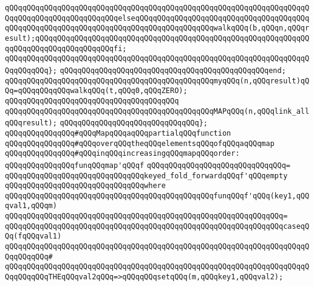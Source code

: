 \verb|qQQqqQQqqQQqqQQqqQQqqQQqqQQqqQQqqQQqqQQqqQQqqQQqqQQqqQQqqQQqqQQqqQQqqQQqqQQqqQQqqQQqqQQqqQQqqQQqelseqQQqqQQqqQQqqQQqqQQqqQQqqQQqqQQqqQQqqQQqqQQqqQQqqQQqqQQqqQQqqQQqqQQqqQQqqQQqqQQqqQQqqQQqwalkqQQq(b,qQQqn,qQQqresult);qQQqqQQqqQQqqQQqqQQqqQQqqQQqqQQqqQQqqQQqqQQqqQQqqQQqqQQqqQQqqQQqqQQqqQQqqQQqqQQqqQQqqQQqfi;|\newline
\verb|qQQqqQQqqQQqqQQqqQQqqQQqqQQqqQQqqQQqqQQqqQQqqQQqqQQqqQQqqQQqqQQqqQQqqQQqqQQqqQQq};|\newline
\verb|qQQqqQQqqQQqqQQqqQQqqQQqqQQqqQQqqQQqqQQqqQQqqQQqend;|\newline
\newline
\verb|qQQqqQQqqQQqqQQqqQQqqQQqqQQqqQQqqQQqqQQqqQQqqQQqmyqQQq(n,qQQqresult)qQQq=qQQqqQQqqQQqwalkqQQq(t,qQQq0,qQQqZERO);|\newline
\verb|qQQqqQQqqQQqqQQqqQQqqQQqqQQqqQQqqQQqqQQq|\newline
\verb|qQQqqQQqqQQqqQQqqQQqqQQqqQQqqQQqqQQqqQQqqQQqqQQqMAPqQQq(n,qQQqlink_allqQQqresult);|\newline
\verb|qQQqqQQqqQQqqQQqqQQqqQQqqQQqqQQq};|\newline
\newline
\verb|qQQqqQQqqQQqqQQq#qQQqMapqQQqaqQQqpartialqQQqfunction|\newline
\verb|qQQqqQQqqQQqqQQq#qQQqoverqQQqtheqQQqelementsqQQqofqQQqaqQQqmap|\newline
\verb|qQQqqQQqqQQqqQQq#qQQqinqQQqincreasingqQQqmapqQQqorder:|\newline
\newline
\verb|qQQqqQQqqQQqqQQqfunqQQqmap'qQQqf|\newline
\verb|qQQqqQQqqQQqqQQqqQQqqQQqqQQqqQQq=|\newline
\verb|qQQqqQQqqQQqqQQqqQQqqQQqqQQqqQQqkeyed_fold_forwardqQQqf'qQQqempty|\newline
\verb|qQQqqQQqqQQqqQQqqQQqqQQqqQQqqQQqwhere|\newline
\verb|qQQqqQQqqQQqqQQqqQQqqQQqqQQqqQQqqQQqqQQqqQQqqQQqfunqQQqf'qQQq(key1,qQQqval1,qQQqm)|\newline
\verb|qQQqqQQqqQQqqQQqqQQqqQQqqQQqqQQqqQQqqQQqqQQqqQQqqQQqqQQqqQQqqQQq=|\newline
\verb|qQQqqQQqqQQqqQQqqQQqqQQqqQQqqQQqqQQqqQQqqQQqqQQqqQQqqQQqqQQqqQQqcaseqQQq(fqQQqval1)|\newline
\verb|qQQqqQQqqQQqqQQqqQQqqQQqqQQqqQQqqQQqqQQqqQQqqQQqqQQqqQQqqQQqqQQqqQQqqQQqqQQqqQQq#|\newline
\verb|qQQqqQQqqQQqqQQqqQQqqQQqqQQqqQQqqQQqqQQqqQQqqQQqqQQqqQQqqQQqqQQqqQQqqQQqqQQqqQQqTHEqQQqval2qQQq=>qQQqqQQqsetqQQq(m,qQQqkey1,qQQqval2);|\newline
